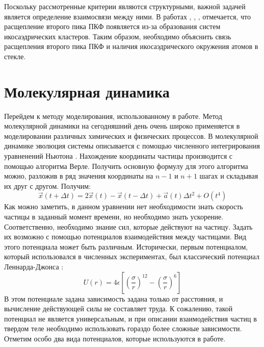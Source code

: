 Поскольку рассмотренные  критерии являются структурными, важной задачей является определение взаимосвязи между ними. В работах \cite{Liu}, \cite{Kolotova}, \cite{Sheng}, \cite{Pan} отмечается, что расщепление второго пика ПКФ появляется  из-за образования систем икосаэдрических кластеров. Таким образом, необходимо объяснить связь расщепления второго пика ПКФ и наличия икосаэдрического окружения атомов в стекле.
\section{Молекулярная динамика}
Перейдем к методу моделирования, использованному в работе. Метод молекулярной динамики на сегодняшний день очень широко применяется в моделировании различных химических и физических процессов. В молекулярной динамике эволюция системы описывается с помощью численного интегрирования уравненений Ньютона \cite{Hamelberg}. Нахождение координаты частицы производится с помощью алгоритма Верле. Получить основную формулу для этого алгоритма можно, разложив в ряд значения координаты на $n-1$ и $n+1$ шагах и складывая их друг с другом. Получим:
\begin{equation}
	\overrightarrow{x}(t+\Delta t) = 2\overrightarrow{x}(t) - \overrightarrow{x}(t-\Delta t)+\overrightarrow{a}(t)\Delta t^2 + O(t^4)
\end{equation}
Как можно заметить, в данном уравнении нет необходимости знать скорость частицы в заданный момент времени, но необходимо знать ускорение. Соответственно, необходимо знание сил, которые действуют на частицу. Задать их возможно с помощью потенциалов взаимодействия между частицами. Вид этого потенциала может быть различным. Исторически, первым потенциалом, который использовался в численных экспериментах, был  классический потенциал Леннарда-Джонса \cite{Lennard}:
\begin{equation}
	U(r) = 4\epsilon\left[\left( \frac{\sigma}{r}\right)^{12}-\left( \frac{\sigma}{r}\right)^{6}\right]
\end{equation}
В этом потенциале задана зависимость задана только от расстояния, и вычисление действующей силы не составляет труда. К сожалению, такой потенциал не является универсальным, и при описании взаимодействия частиц в твердом теле необходимо использовать гораздо более сложные зависимости. Отметим особо два вида потенциалов, которые используются в работе.

